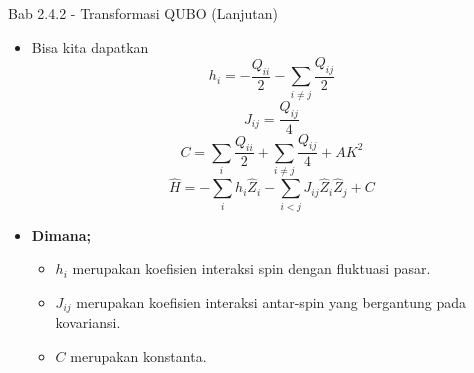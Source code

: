 \begin{frame}{Bab 2.4.2 - Transformasi QUBO (Lanjutan)}
    \begin{itemize}
        \item Bisa kita dapatkan
        \begin{equation*}
            h_i = - \frac{Q_{ii}}{2} - \sum_{i\ne j} \frac{Q_{ij}}{2}
        \end{equation*}
        \begin{equation*}
            J_{ij} = \frac{Q_{ij}}{4}
        \end{equation*}
        \begin{equation*}
            C = \sum_i \frac{Q_{ii}}{2} + \sum_{i\ne j} \frac{Q_{ij}}{4} + AK^2
        \end{equation*}
        \begin{equation*}
            \hat{H} = - \sum_i h_i \hat{Z}_i - \sum_{i<j} J_{ij} \hat{Z}_i \hat{Z}_j + C
        \end{equation*}
        \item \textbf{Dimana;}
        \begin{itemize}
            \item $h_i$ merupakan koefisien interaksi spin dengan fluktuasi pasar.
            \item $J_{ij}$ merupakan koefisien interaksi antar-spin yang bergantung pada kovariansi.
            \item $C$ merupakan konstanta.
        \end{itemize}
    \end{itemize}
\end{frame}
